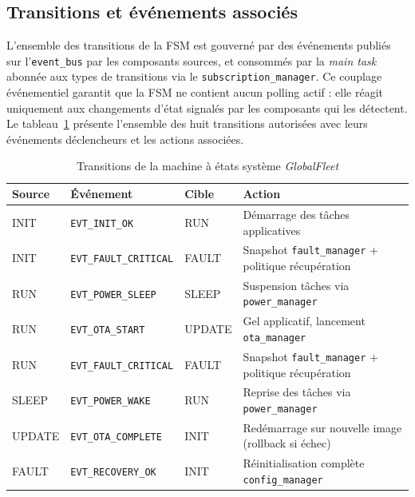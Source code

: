 \subsection{Transitions et événements associés}
\label{subsec:fsm_trans}

L'ensemble des transitions de la FSM est gouverné par des événements
publiés sur l'\texttt{event\_bus} par les composants sources, et
consommés par la \textit{main task} abonnée aux types de transitions
via le \texttt{subscription\_manager}. Ce couplage événementiel
garantit que la FSM ne contient aucun polling actif : elle réagit
uniquement aux changements d'état signalés par les composants qui
les détectent. Le tableau~\ref{tab:transitions} présente l'ensemble
des huit transitions autorisées avec leurs événements déclencheurs
et les actions associées.

\begin{table}[H]
\centering
\renewcommand{\arraystretch}{1.5}
\caption{Transitions de la machine à états système \textit{GlobalFleet}}
\label{tab:transitions}
\small
\begin{tabular}{|l|l|l|p{4.5cm}|}
\hline
\rowcolor{gray!20}
\textbf{Source} & \textbf{Événement} & \textbf{Cible} & \textbf{Action} \\
\hline
INIT   & \texttt{EVT\_INIT\_OK}          & RUN    & Démarrage des tâches applicatives \\
\hline
INIT   & \texttt{EVT\_FAULT\_CRITICAL}   & FAULT  & Snapshot \texttt{fault\_manager} + politique récupération \\
\hline
RUN    & \texttt{EVT\_POWER\_SLEEP}      & SLEEP  & Suspension tâches via \texttt{power\_manager} \\
\hline
RUN    & \texttt{EVT\_OTA\_START}        & UPDATE & Gel applicatif, lancement \texttt{ota\_manager} \\
\hline
RUN    & \texttt{EVT\_FAULT\_CRITICAL}   & FAULT  & Snapshot \texttt{fault\_manager} + politique récupération \\
\hline
SLEEP  & \texttt{EVT\_POWER\_WAKE}       & RUN    & Reprise des tâches via \texttt{power\_manager} \\
\hline
UPDATE & \texttt{EVT\_OTA\_COMPLETE}     & INIT   & Redémarrage sur nouvelle image (rollback si échec) \\
\hline
FAULT  & \texttt{EVT\_RECOVERY\_OK}      & INIT   & Réinitialisation complète \texttt{config\_manager} \\
\hline
\end{tabular}
\end{table}

